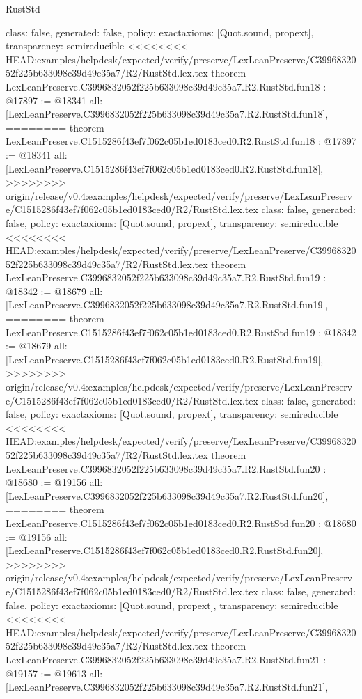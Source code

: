 \begin{lexlean}{RustStd}
\begin{coremodule}
{\begin{coremodule}
{{{{{{{{{{{{{{{{{{{{{  class: false,
  generated: false,
  policy: exact{axioms: [Quot.sound, propext]},
  transparency: semireducible
}
<<<<<<<< HEAD:examples/helpdesk/expected/verify/preserve/LexLeanPreserve/C3996832052f225b633098c39d49c35a7/R2/RustStd.lex.tex
theorem LexLeanPreserve.C3996832052f225b633098c39d49c35a7.R2.RustStd.fun18 : @17897 := @18341 {
  all: [LexLeanPreserve.C3996832052f225b633098c39d49c35a7.R2.RustStd.fun18],
========
theorem LexLeanPreserve.C1515286f43ef7f062c05b1ed0183ced0.R2.RustStd.fun18 : @17897 := @18341 {
  all: [LexLeanPreserve.C1515286f43ef7f062c05b1ed0183ced0.R2.RustStd.fun18],
>>>>>>>> origin/release/v0.4:examples/helpdesk/expected/verify/preserve/LexLeanPreserve/C1515286f43ef7f062c05b1ed0183ced0/R2/RustStd.lex.tex
  class: false,
  generated: false,
  policy: exact{axioms: [Quot.sound, propext]},
  transparency: semireducible
}
<<<<<<<< HEAD:examples/helpdesk/expected/verify/preserve/LexLeanPreserve/C3996832052f225b633098c39d49c35a7/R2/RustStd.lex.tex
theorem LexLeanPreserve.C3996832052f225b633098c39d49c35a7.R2.RustStd.fun19 : @18342 := @18679 {
  all: [LexLeanPreserve.C3996832052f225b633098c39d49c35a7.R2.RustStd.fun19],
========
theorem LexLeanPreserve.C1515286f43ef7f062c05b1ed0183ced0.R2.RustStd.fun19 : @18342 := @18679 {
  all: [LexLeanPreserve.C1515286f43ef7f062c05b1ed0183ced0.R2.RustStd.fun19],
>>>>>>>> origin/release/v0.4:examples/helpdesk/expected/verify/preserve/LexLeanPreserve/C1515286f43ef7f062c05b1ed0183ced0/R2/RustStd.lex.tex
  class: false,
  generated: false,
  policy: exact{axioms: [Quot.sound, propext]},
  transparency: semireducible
}
<<<<<<<< HEAD:examples/helpdesk/expected/verify/preserve/LexLeanPreserve/C3996832052f225b633098c39d49c35a7/R2/RustStd.lex.tex
theorem LexLeanPreserve.C3996832052f225b633098c39d49c35a7.R2.RustStd.fun20 : @18680 := @19156 {
  all: [LexLeanPreserve.C3996832052f225b633098c39d49c35a7.R2.RustStd.fun20],
========
theorem LexLeanPreserve.C1515286f43ef7f062c05b1ed0183ced0.R2.RustStd.fun20 : @18680 := @19156 {
  all: [LexLeanPreserve.C1515286f43ef7f062c05b1ed0183ced0.R2.RustStd.fun20],
>>>>>>>> origin/release/v0.4:examples/helpdesk/expected/verify/preserve/LexLeanPreserve/C1515286f43ef7f062c05b1ed0183ced0/R2/RustStd.lex.tex
  class: false,
  generated: false,
  policy: exact{axioms: [Quot.sound, propext]},
  transparency: semireducible
}
<<<<<<<< HEAD:examples/helpdesk/expected/verify/preserve/LexLeanPreserve/C3996832052f225b633098c39d49c35a7/R2/RustStd.lex.tex
theorem LexLeanPreserve.C3996832052f225b633098c39d49c35a7.R2.RustStd.fun21 : @19157 := @19613 {
  all: [LexLeanPreserve.C3996832052f225b633098c39d49c35a7.R2.RustStd.fun21],
}}}}}}}}}}}}}}}}}}}}}}}}
\end{coremodule}}
\end{coremodule}
\end{lexlean}
